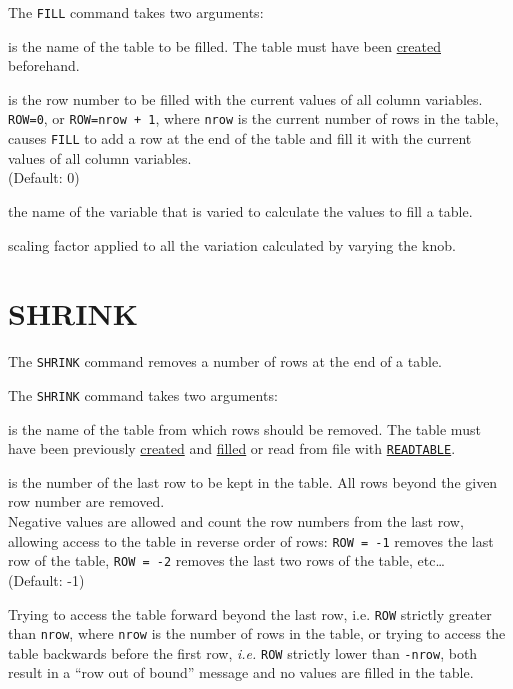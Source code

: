 The \texttt{FILL} command takes two arguments:
\begin{madlist}
   is the name of the table to be filled. The table must
  have been \hyperref[sec:create]{created} beforehand.

   is the row number to be filled with the current values of 
  all column variables. \\ 
  \texttt{ROW=0}, or \texttt{ROW=nrow + 1}, where \texttt{nrow} is the
  current number of rows in the table, causes \texttt{FILL} to add a row at
  the end of the table and fill it with the current values of all
  column variables. \\ (Default: 0) 

   the name of the variable that is varied to calculate the values to fill a table.

   scaling factor applied to all the variation calculated by varying the knob.

\end{madlist}


\section{SHRINK} 
\label{sec:shrink}
The \texttt{SHRINK} command removes a number of rows at the end of a table.

The \texttt{SHRINK} command takes two arguments:
\begin{madlist}
   is the name of the table from which rows should be removed. 
  The table must have been previously \hyperref[sec:create]{created} and 
  \hyperref[sec:fill]{filled} or read from file with
  \hyperref[sec:readtable]{\texttt{READTABLE}}.
	   
   is the number of the last row to be kept in the table. 
  All rows beyond the given row number are removed. \\
  Negative values are allowed and count the row numbers from
  the last row, allowing access to the table in reverse order of rows:
  \texttt{ROW~=~-1} removes the last row of the table,
  \texttt{ROW~=~-2} removes the last two rows of the table,
  etc\ldots  \\ 
  (Default: -1) 
\end{madlist}

Trying to access the table forward beyond the last row, i.e. \texttt{ROW}
strictly greater than \texttt{nrow}, where \texttt{nrow} is the number of
rows in the table, or trying to access the table backwards before the
first row, \textsl{i.e.} \texttt{ROW} strictly lower than \texttt{-nrow},
both result in a ``row out of bound'' message and no values are filled
in the table. 



